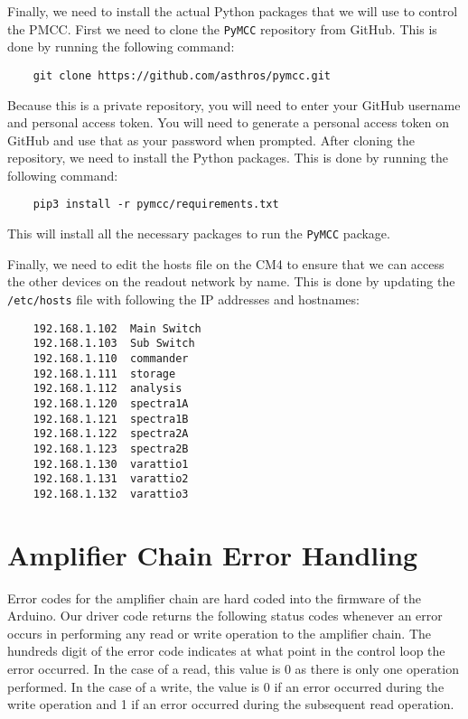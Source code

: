 Finally, we need to install the actual Python packages that we will use to control the PMCC.
First we need to clone the \texttt{PyMCC} repository from GitHub.
This is done by running the following command:
\begin{verbatim}
    git clone https://github.com/asthros/pymcc.git
\end{verbatim}
Because this is a private repository, you will need to enter your GitHub username and personal access token.
You will need to generate a personal access token on GitHub and use that as your password when prompted.
After cloning the repository, we need to install the Python packages.
This is done by running the following command:
\begin{verbatim}
    pip3 install -r pymcc/requirements.txt
\end{verbatim}
This will install all the necessary packages to run the \texttt{PyMCC} package.

Finally, we need to edit the hosts file on the CM4 to ensure that we can access the other devices on the readout network by name.
This is done by updating the \texttt{/etc/hosts} file with following the IP addresses and hostnames:
\begin{verbatim}
    192.168.1.102  Main Switch
    192.168.1.103  Sub Switch
    192.168.1.110  commander
    192.168.1.111  storage
    192.168.1.112  analysis
    192.168.1.120  spectra1A
    192.168.1.121  spectra1B
    192.168.1.122  spectra2A
    192.168.1.123  spectra2B
    192.168.1.130  varattio1
    192.168.1.131  varattio2
    192.168.1.132  varattio3
\end{verbatim}

\chapter{Amplifier Chain Error Handling}
\label{readout/app:if_amp_errors}
Error codes for the amplifier chain are hard coded into the firmware of the Arduino.
Our driver code returns the following status codes whenever an error occurs in performing any read or write operation to the amplifier chain.
The hundreds digit of the error code indicates at what point in the control loop the error occurred.
In the case of a read, this value is 0 as there is only one operation performed.
In the case of a write, the value is 0 if an error occurred during the write operation and 1 if an error occurred during the subsequent read operation.


